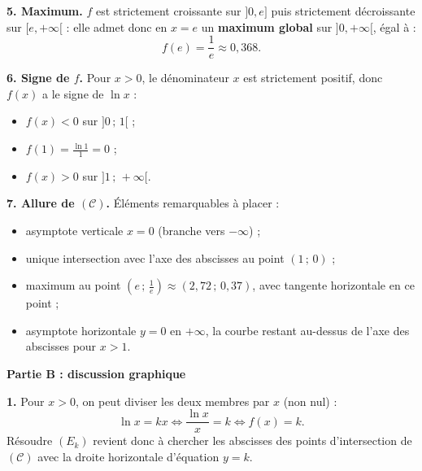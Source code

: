 \documentclass[11pt]{article}
\begin{document}
\begin{corrige}
\textbf{5. Maximum.} $f$ est strictement croissante sur $]0,e]$ puis strictement décroissante sur $[e,+\infty[$ : elle admet donc en $x=e$ un \textbf{maximum global} sur $]0,+\infty[$, égal à :
\[ f(e) = \frac{1}{e} \approx 0{,}368. \]

\textbf{6. Signe de $f$.} Pour $x>0$, le dénominateur $x$ est strictement positif, donc $f(x)$ a le signe de $\ln x$ :
\begin{itemize}
\item $f(x) < 0$ sur $]0\,;\,1[$ ;
\item $f(1) = \frac{\ln 1}{1} = 0$ ;
\item $f(x) > 0$ sur $]1\,;\,+\infty[$.
\end{itemize}

\textbf{7. Allure de $(\mathcal{C})$.} Éléments remarquables à placer :
\begin{itemize}
\item asymptote verticale $x=0$ (branche vers $-\infty$) ;
\item unique intersection avec l'axe des abscisses au point $(1\,;\,0)$ ;
\item maximum au point $\left(e\,;\,\frac{1}{e}\right) \approx (2{,}72\,;\,0{,}37)$, avec tangente horizontale en ce point ;
\item asymptote horizontale $y=0$ en $+\infty$, la courbe restant au-dessus de l'axe des abscisses pour $x>1$.
\end{itemize}

\textbf{Partie B : discussion graphique}

\textbf{1.} Pour $x>0$, on peut diviser les deux membres par $x$ (non nul) :
\[ \ln x = kx \iff \frac{\ln x}{x} = k \iff f(x) = k. \]
Résoudre $(E_k)$ revient donc à chercher les abscisses des points d'intersection de $(\mathcal{C})$ avec la droite horizontale d'équation $y=k$.


\end{corrige}
\end{document}
